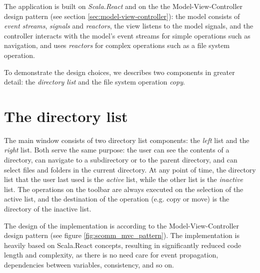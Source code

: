 The application is built on \emph{Scala.React} and on the the Model-View-Controller design pattern (see section \ref{sec:model-view-controller}): the model consists of \emph{event streams},  \emph{signals} and \emph{reactors}, the view listens to the model signals, and the controller interacts with the model's event streams for simple operations such as navigation, and uses \emph{reactors} for complex operations such as a file system operation.

To demonstrate the design choices, we describes two components in greater detail: the \emph{directory list} and the file system operation \emph{copy}.

\section{The directory list}

The main window consists of two directory list components: the \emph{left} list and the \emph{right} list. Both serve the same purpose: the user can see the contents of a directory, can navigate to a subdirectory or to the parent directory, and can select files and folders in the current directory. At any point of time, the directory list that the user last used is the \emph{active} list, while the other list is the \emph{inactive} list. The operations on the toolbar are always executed on the selection of the active list, and the destination of the operation (e.g. copy or move) is the directory of the inactive list.

The design of the implementation is according to the Model-View-Controller design pattern (see figure \ref{fig:scomm_mvc_pattern}). The implementation is heavily based on Scala.React concepts, resulting in significantly reduced code length and complexity, as there is no need care for event propagation, dependencies between variables, consistency, and so on.


